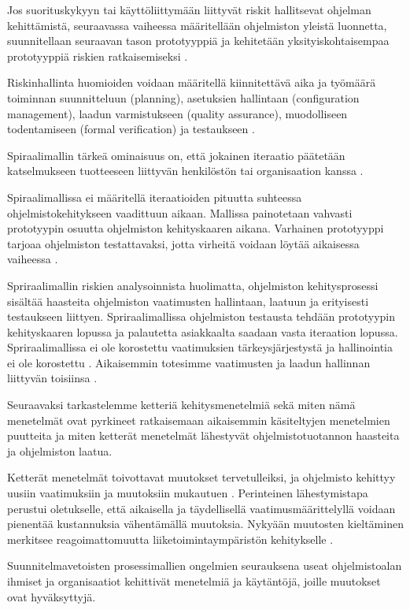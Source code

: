 \documentclass[finnish]{tktltiki2}
\theoremstyle{definition}
\theoremstyle{remark}
\begin{document}
Jos suorituskykyyn tai käyttöliittymään liittyvät riskit hallitsevat ohjelman kehittämistä, seuraavassa vaiheessa määritellään ohjelmiston yleistä luonnetta, suunnitellaan seuraavan tason prototyyppiä ja kehitetään yksityiskohtaisempaa prototyyppiä riskien ratkaisemiseksi \cite{BOE88}.

Riskinhallinta huomioiden voidaan määritellä kiinnitettävä aika ja työmäärä toiminnan suunnitteluun (planning), asetuksien hallintaan (configuration management), laadun varmistukseen (quality assurance), muodolliseen todentamiseen (formal verification) ja testaukseen \cite{BOE88}.

Spiraalimallin tärkeä ominaisuus on, että jokainen iteraatio päätetään katselmukseen tuotteeseen liittyvän henkilöstön tai organisaation kanssa \cite{BOE88}.


Spiraalimallissa ei määritellä iteraatioiden pituutta suhteessa ohjelmistokehitykseen vaadittuun aikaan. Mallissa painotetaan vahvasti prototyypin osuutta ohjelmiston kehityskaaren aikana. Varhainen prototyyppi tarjoaa ohjelmiston testattavaksi, jotta virheitä voidaan löytää aikaisessa vaiheessa \cite{BOE88}.

Spriraalimallin riskien analysoinnista huolimatta, ohjelmiston kehitysprosessi sisältää haasteita ohjelmiston vaatimusten hallintaan, laatuun ja erityisesti testaukseen liittyen. Spriraalimallissa ohjelmiston testausta tehdään prototyypin kehityskaaren lopussa ja palautetta asiakkaalta saadaan vasta iteraation lopussa. Spriraalimallissa ei ole korostettu vaatimuksien tärkeys\-järjestystä ja hallinointia ei ole korostettu \cite{BOE88}. Aikaisemmin totesimme vaatimusten ja laadun hallinnan liittyvän toisiinsa \cite{KIP96}. 

Seuraavaksi tarkastelemme ketteriä kehitysmenetelmiä sekä miten nämä menetelmät ovat pyrkineet ratkaisemaan aikaisemmin käsiteltyjen menetelmien puutteita ja miten ketterät menetelmät lähestyvät ohjelmistotuotannon haasteita ja ohjelmiston laatua. 

Ketterät menetelmät toivottavat muutokset tervetulleiksi, ja ohjelmisto kehittyy uusiin vaatimuksiin ja muutoksiin mukautuen \cite{WIC03}. Perinteinen lähestymistapa perustui oletukselle, että aikaisella ja täydellisellä vaatimusmäärittelyllä voidaan pienentää kustannuksia vähentämällä muutoksia. Nykyään muutosten kieltäminen merkitsee reagoimattomuutta liiketoimintaympäristön kehitykselle \cite{HIC01}.

Suunnitelmavetoisten prosessimallien ongelmien seurauksena useat ohjelmistoalan ihmiset ja organisaatiot kehittivät menetelmiä ja käytäntöjä, joille muutokset ovat hyväksyttyjä. 
\end{document}
